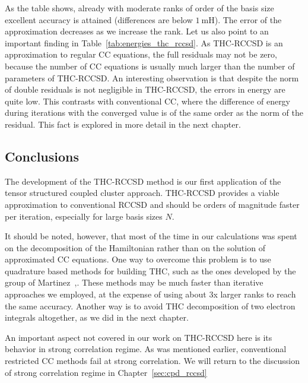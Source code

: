 %
As the table shows, already with moderate ranks of order of the basis size 
excellent accuracy is attained (differences are below $1 ~ \mathrm{mH}$). The 
error of the approximation decreases as we increase the rank. Let us 
also point to an important finding in Table~\ref{tab:energies_thc_rccsd}. As 
THC-RCCSD is an approximation to regular CC equations, the full residuals may 
not be zero, because the number of CC equations is usually much larger than the 
number of parameters of THC-RCCSD. An interesting observation is that despite 
the norm of double residuals is not negligible in THC-RCCSD, the errors in 
energy are quite low. This contrasts with conventional CC, where the 
difference of energy during iterations with the converged value  
is of the same order as the norm of the residual. This fact is explored in 
more detail in the next chapter. 

\subsection{Conclusions}
The development of the THC-RCCSD method is our first application of the tensor 
structured coupled cluster approach.\cite{schutski2017tensor} THC-RCCSD provides 
a viable approximation to conventional RCCSD and should be orders of magnitude 
faster per iteration, especially for large basis sizes $N$. 

It should be noted, however, that most of the time in our 
calculations was spent on the decomposition of the Hamiltonian rather
than on the solution of approximated CC equations. 
One way to overcome this problem is to use quadrature based methods for 
building THC, such as the ones developed by the group of 
Martinez~\cite{hohenstein_thc1},\cite{parrish2013discrete}. These 
methods may be much faster than iterative approaches we employed, at the 
expense of using about 3x larger ranks to reach the same 
accuracy.\cite{parrish2013discrete} Another way is to avoid THC decomposition 
of two electron integrals altogether, as we did in the next
chapter.

An important aspect not covered in our work on THC-RCCSD here is its behavior 
in strong correlation regime. As was mentioned earlier, conventional restricted 
CC methods fail at strong correlation. We will return to the 
discussion of strong correlation regime in Chapter~\ref{sec:cpd_rccsd}